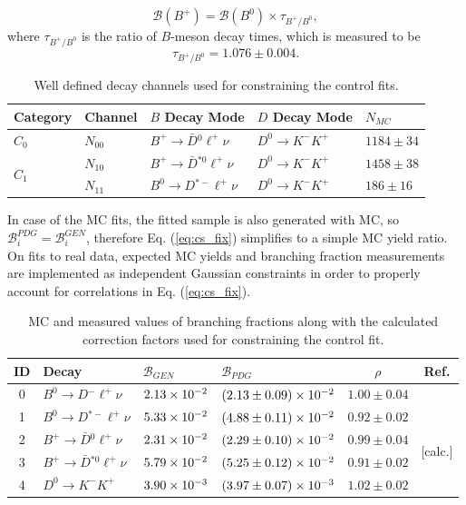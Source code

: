 \begin{equation}
\mathcal{B}(B^+) = \mathcal{B}(B^0) \times \tau_{B^+/B^0},
\end{equation}
where $\tau_{B^+/B^0}$ is the ratio of $B$-meson decay times, which is measured to be \cite{Amhis:2016xyh}
\begin{equation}
\tau_{B^+/B^0} = 1.076 \pm 0.004.
\end{equation}

\begin{table}[H]
	\centering
	\begin{tabular}{l|l|l|l|l}
		Category & Channel & $B$ Decay Mode & $D$ Decay Mode & $N_{MC}$ \\
		\toprule
		$C_0$ & $N_{00}$ & $B^+ \to \bar D {}^{0} \ell^+ \nu$ & $D^0 \to K^-K^+$ & $1184 \pm 34$\\
		\midrule
		\multirow{2}{*}{$C_1$} & $N_{10}$ & $B^+ \to \bar D {}^{*0} \ell^+ \nu$ & $D^0 \to K^-K^+$ & $1458\pm38$\\
		& $N_{11}$ & $B^0 \to D {}^{*-} \ell^+ \nu$ & $D^0 \to K^-K^+$ & $186\pm16$\\
		\bottomrule
	\end{tabular}
	\captionsetup{width=0.8\linewidth}
	\caption{Well defined decay channels used for constraining the control fits.}
	\label{tab:cs_constraint_table}
\end{table}

In case of the MC fits, the fitted sample is also generated with MC, so $\mathcal{B}_{i}^{PDG} = \mathcal{B}_{i}^{GEN}$, therefore Eq. (\ref{eq:cs_fix}) simplifies to a simple MC yield ratio. On fits to real data, expected MC yields and branching fraction measurements are implemented as independent Gaussian constraints in order to properly account for correlations in Eq. (\ref{eq:cs_fix}).
\begin{table}[H]
	\centering
	\begin{tabular}{c|l|l|l|c|c}
		ID & Decay & $\mathcal{B}_{GEN}$ & $\mathcal{B}_{PDG}$ & $\rho$ & Ref. \\
		\toprule
		0 & $B^0 \to D {}^{-} \ell^+ \nu$ & $2.13\times 10^{-2}$ & $(2.13 \pm 0.09)\times 10^{-2}$ & $1.00 \pm 0.04$ & \multirow{2}{*}{\cite{Amhis:2016xyh}} \\ 
		1 & $B^0 \to D {}^{*-} \ell^+ \nu$ & $5.33\times 10^{-2}$ & $(4.88 \pm 0.11)\times 10^{-2}$ & $0.92 \pm 0.02$ & \\
		\cline{6-6}
		2 & $B^+ \to \bar D {}^{0} \ell^+ \nu$ & $2.31\times 10^{-2}$ & $(2.29 \pm 0.10)\times 10^{-2}$ &  $0.99 \pm 0.04$ & \multirow{2}{*}{[calc.]} \\ 
		3 & $B^+ \to \bar D {}^{*0} \ell^+ \nu$ & $5.79\times 10^{-2}$ & $(5.25 \pm 0.12)\times 10^{-2}$ &  $0.91 \pm 0.02$ & \\
		\cline{6-6}
		4 & $D^0 \to K^-K^+$ & $3.90\times 10^{-3}$ & $(3.97\pm0.07)\times 10^{-3}$ & $1.02 \pm 0.02$ & \cite{tanabashi2018review} \\
		\bottomrule
	\end{tabular}
	\captionsetup{width=0.8\linewidth}
	\caption{MC and measured values of branching fractions along with the calculated correction factors used for constraining the control fit.}
	\label{tab:cs_br_constraint_table}
\end{table}

